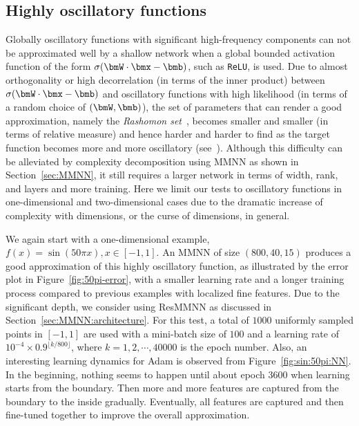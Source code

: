 \documentclass[review,hidelinks,onefignum,onetabnum]{siamart250211}
\begin{document}




\subsection{Highly oscillatory functions}\label{sec:oscillatory}

Globally oscillatory functions with significant high-frequency components can not be approximated well by a shallow network when a global bounded activation function of the form $\sigma(\bmW\cdot \bmx-\bmb)$, such as \texttt{ReLU}, is used. Due to almost orthogonality or high decorrelation (in terms of the inner product) between $\sigma(\bmW\cdot \bmx-\bmb)$ and oscillatory functions with high likelihood (in terms of a random choice of $(\bmW, \bmb)$), the set of parameters that can render a good approximation, namely the \emph{Rashomon set}~\cite{semenova2022existence}, becomes smaller and smaller (in terms of relative measure) and hence harder and harder to find as the target function becomes more and more oscillatory (see~\cite{ZZZZ-23}). Although this difficulty can be alleviated by complexity decomposition using MMNN as shown in Section~\ref{sec:MMNN}, it still requires a larger network in terms of width, rank, and layers and more training. Here we limit our tests to oscillatory functions in one-dimensional and two-dimensional cases due to the dramatic increase of complexity with dimensions, or the curse of dimensions, in general. 

We again start with a one-dimensional example, $f(x)=\sin(50\pi x), x\in[-1,1]$. An MMNN of size $(800,40,15)$ produces a good approximation of this highly oscillatory function, as illustrated by the error plot in Figure~\ref{fig:50pi-error}, with a smaller learning rate and a longer training process compared to previous examples with localized fine features. Due to the significant depth, we consider using ResMMNN as discussed in Section~\ref{sec:MMNN:architecture}. For this test, a total of $1000$ uniformly sampled points in $[-1,1]$ are used with a mini-batch size of $100$ and a learning rate of $10^{-4}\times 0.9^{\lfloor k/800 \rfloor}$, where $k=1,2,\cdots,40000$ is the epoch number. Also, an interesting learning dynamics for Adam is observed from Figure~\ref{fig:sin:50pi:NN}. In the beginning, nothing seems to happen until about epoch 3600 when learning starts from the boundary. Then more and more features are captured from the boundary to the inside gradually. Eventually, all features are captured and then fine-tuned together to improve the overall approximation. 
\end{document}
